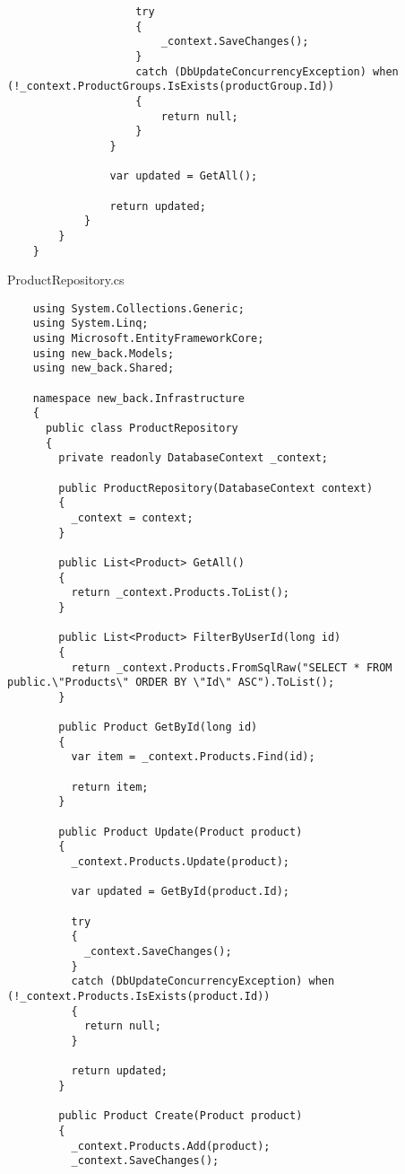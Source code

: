 \begin{lstlisting}
                    try
                    {
                        _context.SaveChanges();
                    }
                    catch (DbUpdateConcurrencyException) when (!_context.ProductGroups.IsExists(productGroup.Id))
                    {
                        return null;
                    }
                }
    
                var updated = GetAll();
    
                return updated;
            }
        }
    }
\end{lstlisting}

ProductRepository.cs
\lstset{style=sharpc}
\begin{lstlisting}
    using System.Collections.Generic;
    using System.Linq;
    using Microsoft.EntityFrameworkCore;
    using new_back.Models;
    using new_back.Shared;
    
    namespace new_back.Infrastructure
    {
      public class ProductRepository
      {
        private readonly DatabaseContext _context;
    
        public ProductRepository(DatabaseContext context)
        {
          _context = context;
        }
    
        public List<Product> GetAll()
        {
          return _context.Products.ToList();
        }
    
        public List<Product> FilterByUserId(long id)
        {
          return _context.Products.FromSqlRaw("SELECT * FROM public.\"Products\" ORDER BY \"Id\" ASC").ToList();
        }
    
        public Product GetById(long id)
        {
          var item = _context.Products.Find(id);
    
          return item;
        }
    
        public Product Update(Product product)
        {
          _context.Products.Update(product);
    
          var updated = GetById(product.Id);
    
          try
          {
            _context.SaveChanges();
          }
          catch (DbUpdateConcurrencyException) when (!_context.Products.IsExists(product.Id))
          {
            return null;
          }
    
          return updated;
        }
    
        public Product Create(Product product)
        {
          _context.Products.Add(product);
          _context.SaveChanges();
    

\end{lstlisting}
